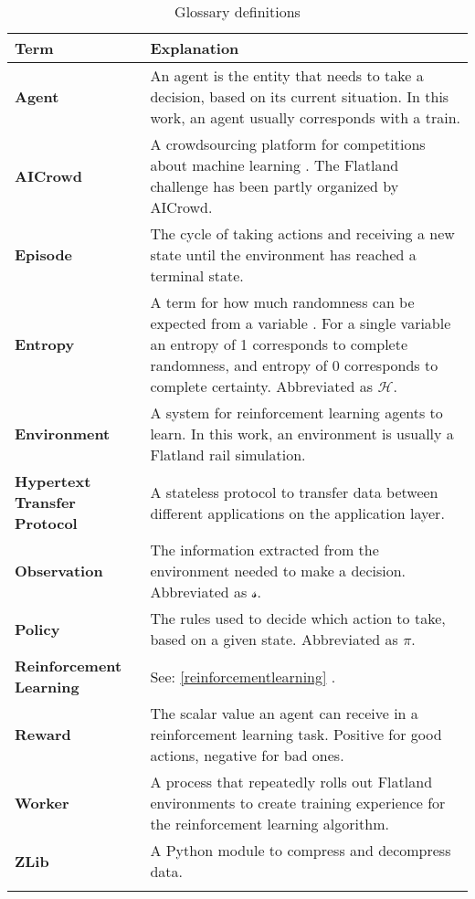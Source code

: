 \begin{longtable}{|m{3cm}|m{11cm}|}\hline
\rowcolor{gray} \textbf{Term}&
Explanation \\ 
\hline

\textbf{Agent}&
An agent is the entity that needs to take a decision, based on its current situation. In this work, an agent usually corresponds with a train.\\
\hline

\textbf{AICrowd}&
A crowdsourcing platform for competitions about machine learning \cite{aicrowd_startpage}. The Flatland challenge has been partly organized by AICrowd.\\ 
\hline

\textbf{Episode}&
The cycle of taking actions and receiving a new state until the environment has reached a terminal state. \\ 
\hline

\textbf{Entropy}&
A term for how much randomness can be expected from a variable \cite{entropy_shannon}.
For a single variable an entropy of 1 corresponds to complete randomness, and entropy of 0 corresponds to complete certainty.
Abbreviated as $\mathcal{H}$.\\ 
\hline

\textbf{Environment}&
A system for reinforcement learning agents to learn. In this work, an environment is usually a Flatland rail simulation.\\
\hline

\textbf{Hypertext Transfer Protocol}&
A stateless protocol to transfer data between different applications on the application layer. \\ \hline

\textbf{Observation}&
The information extracted from the environment needed to make a decision. Abbreviated as $\mathcal{s}$.\\ 
\hline

\textbf{Policy}&
The rules used to decide which action to take, based on a given state. Abbreviated as $\pi$.\\ 
\hline

\textbf{Reinforcement Learning}&
See: \ref{reinforcementlearning} \nameref{reinforcementlearning}.\\
\hline

\textbf{Reward}&
The scalar value an agent can receive in a reinforcement learning task. Positive for good actions, negative for bad ones.\\ 
\hline

\textbf{Worker}&
A process that repeatedly rolls out Flatland environments to create training experience for the reinforcement learning algorithm.\\
\hline

\textbf{ZLib}&
A Python module to compress and decompress data. \\ \hline





\caption{Glossary definitions}
\label{tab:glossar}
\end{longtable}
\clearpage

